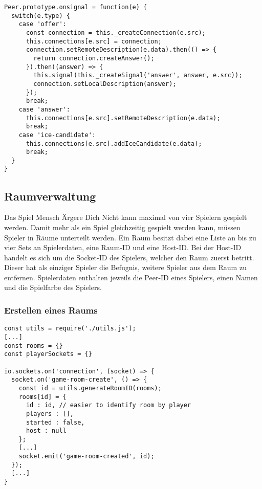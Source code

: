 \vspace{5pt}
\lstset{language=js, style=STYLE_CODE_JS}
\begin{singlespace}
\begin{minipage}{\textwidth}
\begin{lstlisting}[caption={Funktion zum Verarbeiten von Signalnachrichten -- Peer.js}, captionpos=b, label={lst:onsignal}]
Peer.prototype.onsignal = function(e) {
  switch(e.type) {
    case 'offer':
      const connection = this._createConnection(e.src);
      this.connections[e.src] = connection;
      connection.setRemoteDescription(e.data).then(() => {
        return connection.createAnswer();
      }).then((answer) => {
        this.signal(this._createSignal('answer', answer, e.src));
        connection.setLocalDescription(answer);
      });
      break;
    case 'answer':
      this.connections[e.src].setRemoteDescription(e.data);
      break;
    case 'ice-candidate':
      this.connections[e.src].addIceCandidate(e.data);
      break;
  }
}
\end{lstlisting}
\end{minipage}
\end{singlespace}

\subsection{Raumverwaltung}
Das Spiel \glqq{}Mensch Ärgere Dich Nicht\grqq{} kann maximal von vier Spielern gespielt werden. Damit mehr als ein Spiel gleichzeitig gespielt werden kann, müssen Spieler in \glqq{}Räume\grqq{} unterteilt werden. Ein Raum besitzt dabei eine Liste an bis zu vier Sets an Spielerdaten, eine Raum-ID und eine Host-ID. Bei der Host-ID handelt es sich um die Socket-ID des Spielers, welcher den Raum zuerst betritt. Dieser hat als einziger Spieler die Befugnis, weitere Spieler aus dem Raum zu entfernen. Spielerdaten enthalten jeweils die Peer-ID eines Spielers, einen Namen und die Spielfarbe des Spielers.

\subsubsection{Erstellen eines Raums}
\vspace{5pt}
\lstset{language=js, style=STYLE_CODE_JS}
\begin{singlespace}
\begin{minipage}{\textwidth}
\begin{lstlisting}[caption={Event zum Erstellen eines Raums -- Server.js}, captionpos=b, label={lst:imamakedaroom}]
const utils = require('./utils.js');
[...]
const rooms = {}
const playerSockets = {}

io.sockets.on('connection', (socket) => {
  socket.on('game-room-create', () => {
    const id = utils.generateRoomID(rooms);
    rooms[id] = {
      id : id, // easier to identify room by player
      players : [],
      started : false,
      host : null
    };
    [...]	
    socket.emit('game-room-created', id);
  });
  [...]
}
\end{lstlisting}
\end{minipage}
\end{singlespace}

